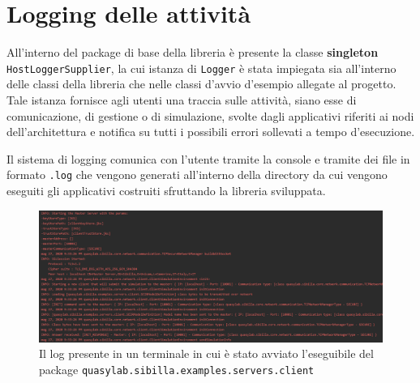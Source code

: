 \section{Logging delle attività}
All'interno del package di base della libreria è presente la classe \textbf{singleton} \texttt{HostLoggerSupplier}, la cui istanza di \texttt{Logger} è stata impiegata sia all'interno delle classi della libreria che nelle classi d'avvio d'esempio allegate al progetto.
Tale istanza fornisce agli utenti una traccia sulle attività, siano esse di comunicazione, di gestione o di simulazione, svolte dagli applicativi riferiti ai nodi dell'architettura e notifica su tutti i possibili errori sollevati a tempo d'esecuzione.

Il sistema di logging comunica con l'utente tramite la console e tramite dei file in formato \texttt{.log} che vengono generati all'interno della directory da cui vengono eseguiti gli applicativi costruiti sfruttando la libreria sviluppata.

\begin{figure}[H]
    \includegraphics[width=\linewidth]{images/clientexamplelog.png}
    \captionsetup{justification=centering}
    \caption{Il log presente in un terminale in cui è stato avviato l'eseguibile del package \texttt{quasylab.sibilla.examples.servers.client}}
  \end{figure}
